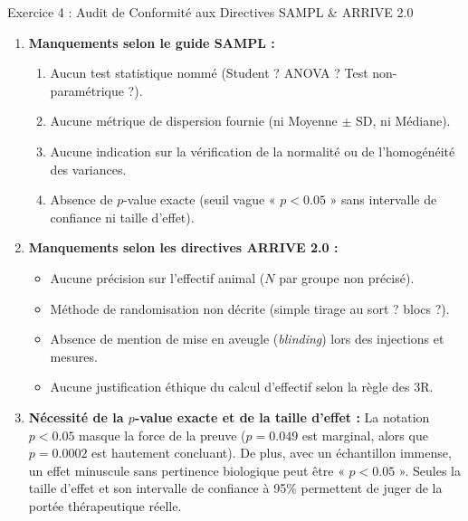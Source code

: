 \documentclass[11pt,a4paper]{article}
\begin{document}
\begin{solutionbox}{Exercice 4 : Audit de Conformité aux Directives SAMPL \& ARRIVE 2.0}
\begin{enumerate}[label=\textbf{\alph*.}]
  \item \textbf{Manquements selon le guide SAMPL :}
  \begin{enumerate}
    \item Aucun test statistique nommé (Student ? ANOVA ? Test non-paramétrique ?).
    \item Aucune métrique de dispersion fournie (ni Moyenne $\pm$ SD, ni Médiane).
    \item Aucune indication sur la vérification de la normalité ou de l'homogénéité des variances.
    \item Absence de $p$-value exacte (seuil vague « $p < 0.05$ » sans intervalle de confiance ni taille d'effet).
  \end{enumerate}

  \item \textbf{Manquements selon les directives ARRIVE 2.0 :}
  \begin{itemize}
    \item Aucune précision sur l'effectif animal ($N$ par groupe non précisé).
    \item Méthode de randomisation non décrite (simple tirage au sort ? blocs ?).
    \item Absence de mention de mise en aveugle (\textit{blinding}) lors des injections et mesures.
    \item Aucune justification éthique du calcul d'effectif selon la règle des 3R.
  \end{itemize}

  \item \textbf{Nécessité de la $p$-value exacte et de la taille d'effet :}
  La notation $p < 0.05$ masque la force de la preuve ($p = 0.049$ est marginal, alors que $p = 0.0002$ est hautement concluant). De plus, avec un échantillon immense, un effet minuscule sans pertinence biologique peut être « $p < 0.05$ ». Seules la taille d'effet et son intervalle de confiance à 95\% permettent de juger de la portée thérapeutique réelle.
\end{enumerate}
\end{solutionbox}
\end{document}
